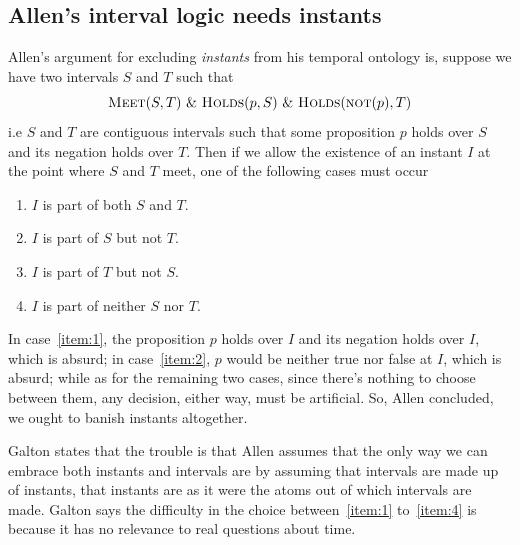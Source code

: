 \subsection{Allen's interval logic needs instants}
Allen's argument for excluding \textit{instants} from his temporal ontology is, suppose we have two intervals $S$ and $T$ such that
\[
	\textsc{Meet}(S, T) \  \& \  \textsc{Holds}(p, S) \ \&  \ \textsc{Holds}(\textsc{not}(p), T)
\]
i.e $S$ and $T$ are contiguous intervals such that some proposition $p$ holds over $S$ and its negation holds over $T$. Then if we allow the existence of an instant $I$ at the point where $S$ and $T$ meet, one of the following cases must occur
\begin{enumerate}[label=(\arabic*)]
	\item  $I$ is part of both $S$ and $T$.\label{item:1}
	\item  $I$ is part of $S$ but not $T$.\label{item:2}
	\item  $I$ is part of $T$ but not $S$. \label{item:3}
	\item  $I$ is part of neither $S$ nor $T$. \label{item:4}
\end{enumerate}
In case~\ref{item:1}, the proposition $p$ holds over $I$ and its negation holds over $I$, which is absurd;
in case~\ref{item:2}, $p$ would be neither true nor false at $I$, which is absurd;
while as for the remaining two cases, since there's nothing to choose between them, any decision, either way, must be artificial. So, Allen concluded, we ought to banish instants altogether.

Galton states that the trouble is that Allen assumes that the only way we can embrace both instants and
intervals are by assuming that intervals are made up of instants, that instants are as it were the atoms out of which intervals are made.
Galton says the difficulty in the choice between~\ref{item:1} to~\ref{item:4} is because it has no relevance to real questions about time.

%
%
%
%

